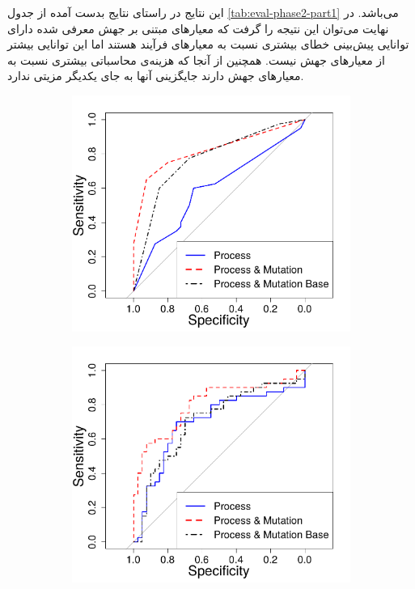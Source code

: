 این نتایج در راستای نتایج بدست آمده از جدول \ref{tab:eval-phase2-part1} می‌باشد. در نهایت می‌توان این نتیجه را گرفت که معیارهای مبتنی بر جهش معرفی شده دارای توانایی پیش‌بینی خطای بیشتری نسبت به معیارهای فرآیند هستند اما این توانایی بیشتر از معیارهای جهش نیست. همچنین از آنجا که هزینه‌ی محاسباتی بیشتری نسبت به معیارهای جهش دارند جایگزینی آنها به جای یکدیگر مزیتی ندارد. 

\begin{figure}[H]
	\begin{subfigure}{.5\textwidth}
		\centering
		\includegraphics[width=\linewidth]{img/evaluation/phase2-part1-roc-dt.pdf}
		\caption{}
	\end{subfigure}
	\begin{subfigure}{.5\textwidth}
		\centering
		\includegraphics[width=\linewidth]{img/evaluation/phase2-part1-roc-svm.pdf}

\end{subfigure}
\end{figure}
